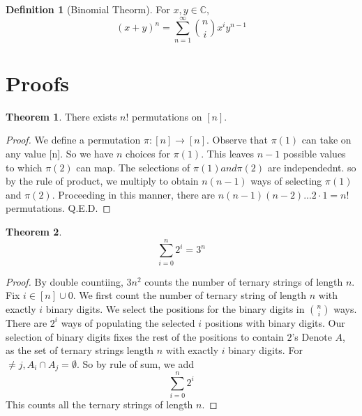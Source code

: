 \documentclass{article}
\theoremstyle{definition}
\newtheorem{definition}{Definition}[section]
\newtheorem{theorem}{Theorem}[section]
\begin{document}
\begin{definition}[Binomial Theorm]
\label {binomialTheorem}
For $x,y \in \mathbb{C}$, $$(x+y)^n = {\sum_{n=1}^{\infty}}{{n}\choose{i}}x^{i}y^{n-1}$$
\end{definition}

\section{Proofs}

\begin{theorem}
There exists $n!$ permutations on $[n]$.
\end{theorem}
\begin{proof}We define a permutation $\pi: [n] \rightarrow [n]$. Observe that $\pi(1)$ can take on any value [n]. So we have $n$ choices for $\pi(1)$. This leaves $n-1$ possible values to which $\pi(2)$ can map. The selections of $\pi(1) and \pi(2)$ are independednt. so by the rule of product, we multiply to obtain $n(n-1)$ ways of selecting $\pi (1)$ and $\pi(2)$. Proceeding in this manner, there are $n(n-1)(n-2)...2 \cdot 1 = n!$ permutations. Q.E.D.
\end{proof}

\begin{theorem}
$$\sum_{i=0}^{n} 2^{i} = 3^n$$
\end{theorem}
\begin{proof}
By double countiing, $3n^2$ counts the number of ternary strings of length $n$. Fix $i \in[n]\cup{0}$. We first count the number of ternary string of length $n$ with exactly $i$ binary digits. We select the positions for the binary digits in ${n}\choose{i}$ ways. There are $2^i$ ways of populating the selected $i$ positions with binary digits. Our selection of binary digits fixes the rest of the positions to contain $2$'s Denote $A$, as the set of ternary strings length $n$ with exactly $i$ binary digits. For $ \neq j, A_i \cap A_j = \emptyset$. So by rule of sum, we add $$\sum_{i=0}^{n} 2^{i}$$ This counts all the ternary strings of length $n$.
\end{proof}
\end{document}
